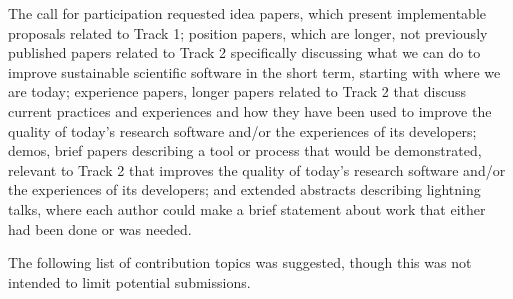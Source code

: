 \documentclass[11pt, oneside]{amsart}
\begin{document}
The call for participation requested
idea papers, which present implementable proposals related to Track 1;
position papers, which are longer, not previously published papers related to
Track 2 specifically discussing what we can do to improve sustainable scientific
software in the short term, starting with where we are today;
experience papers, longer papers related to Track 2 that discuss current
practices and experiences and how they have been used to improve the quality of
today's research software and/or the experiences of its developers;
demos, brief papers describing a tool or
process that would be demonstrated, relevant to Track 2 that improves the quality of today's research
software and\slash or the experiences of its developers; and
extended abstracts describing lightning talks,
where each author could make a brief statement about work that either had been
done or was needed.

The following list of contribution topics was suggested, though this was not intended to limit potential submissions.
\end{document}
